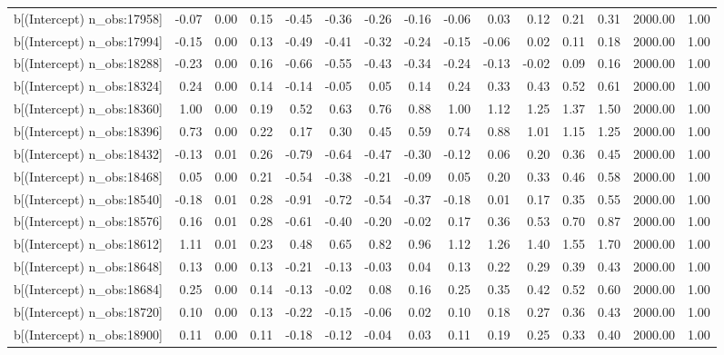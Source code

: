 \begin{table}[ht]
\begin{tabular}{rrrrrrrrrrrrrrr}
  b[(Intercept) n\_obs:17958] & -0.07 & 0.00 & 0.15 & -0.45 & -0.36 & -0.26 & -0.16 & -0.06 & 0.03 & 0.12 & 0.21 & 0.31 & 2000.00 & 1.00 \\ 
  b[(Intercept) n\_obs:17994] & -0.15 & 0.00 & 0.13 & -0.49 & -0.41 & -0.32 & -0.24 & -0.15 & -0.06 & 0.02 & 0.11 & 0.18 & 2000.00 & 1.00 \\ 
  b[(Intercept) n\_obs:18288] & -0.23 & 0.00 & 0.16 & -0.66 & -0.55 & -0.43 & -0.34 & -0.24 & -0.13 & -0.02 & 0.09 & 0.16 & 2000.00 & 1.00 \\ 
  b[(Intercept) n\_obs:18324] & 0.24 & 0.00 & 0.14 & -0.14 & -0.05 & 0.05 & 0.14 & 0.24 & 0.33 & 0.43 & 0.52 & 0.61 & 2000.00 & 1.00 \\ 
  b[(Intercept) n\_obs:18360] & 1.00 & 0.00 & 0.19 & 0.52 & 0.63 & 0.76 & 0.88 & 1.00 & 1.12 & 1.25 & 1.37 & 1.50 & 2000.00 & 1.00 \\ 
  b[(Intercept) n\_obs:18396] & 0.73 & 0.00 & 0.22 & 0.17 & 0.30 & 0.45 & 0.59 & 0.74 & 0.88 & 1.01 & 1.15 & 1.25 & 2000.00 & 1.00 \\ 
  b[(Intercept) n\_obs:18432] & -0.13 & 0.01 & 0.26 & -0.79 & -0.64 & -0.47 & -0.30 & -0.12 & 0.06 & 0.20 & 0.36 & 0.45 & 2000.00 & 1.00 \\ 
  b[(Intercept) n\_obs:18468] & 0.05 & 0.00 & 0.21 & -0.54 & -0.38 & -0.21 & -0.09 & 0.05 & 0.20 & 0.33 & 0.46 & 0.58 & 2000.00 & 1.00 \\ 
  b[(Intercept) n\_obs:18540] & -0.18 & 0.01 & 0.28 & -0.91 & -0.72 & -0.54 & -0.37 & -0.18 & 0.01 & 0.17 & 0.35 & 0.55 & 2000.00 & 1.00 \\ 
  b[(Intercept) n\_obs:18576] & 0.16 & 0.01 & 0.28 & -0.61 & -0.40 & -0.20 & -0.02 & 0.17 & 0.36 & 0.53 & 0.70 & 0.87 & 2000.00 & 1.00 \\ 
  b[(Intercept) n\_obs:18612] & 1.11 & 0.01 & 0.23 & 0.48 & 0.65 & 0.82 & 0.96 & 1.12 & 1.26 & 1.40 & 1.55 & 1.70 & 2000.00 & 1.00 \\ 
  b[(Intercept) n\_obs:18648] & 0.13 & 0.00 & 0.13 & -0.21 & -0.13 & -0.03 & 0.04 & 0.13 & 0.22 & 0.29 & 0.39 & 0.43 & 2000.00 & 1.00 \\ 
  b[(Intercept) n\_obs:18684] & 0.25 & 0.00 & 0.14 & -0.13 & -0.02 & 0.08 & 0.16 & 0.25 & 0.35 & 0.42 & 0.52 & 0.60 & 2000.00 & 1.00 \\ 
  b[(Intercept) n\_obs:18720] & 0.10 & 0.00 & 0.13 & -0.22 & -0.15 & -0.06 & 0.02 & 0.10 & 0.18 & 0.27 & 0.36 & 0.43 & 2000.00 & 1.00 \\ 
  b[(Intercept) n\_obs:18900] & 0.11 & 0.00 & 0.11 & -0.18 & -0.12 & -0.04 & 0.03 & 0.11 & 0.19 & 0.25 & 0.33 & 0.40 & 2000.00 & 1.00 \\ 

\end{tabular}
\end{table}
